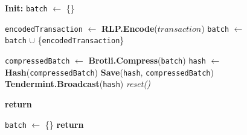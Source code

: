 \begin{figure}[t!]
  \begin{adjustbox}{minipage=[t]{\columnwidth}}
    \begin{algorithm}[H]
      \renewcommand{\thealgorithm}{Hash Collector}         
      \caption{}%
      \label{alg:collector-hash}%
      \small
      \begin{algorithmic}[1]
            \State \textbf{Init:} \texttt{batch} $\leftarrow$ \{\}
      
            \label{alg3:add_tx}
            		\State \texttt{encodedTransaction} $\leftarrow$ \textbf{RLP.Encode}($transaction$)
				\State \texttt{batch} $\leftarrow$ \texttt{batch} $\cup$ \{\texttt{encodedTransaction}\}
            
             		\State \texttt{compressedBatch} $\leftarrow$  \textbf{Brotli.Compress}(\texttt{batch})
             		\State \texttt{hash} $\leftarrow$ \textbf{Hash}(\texttt{compressedBatch})
             		\State \textbf{Save}(\texttt{hash}, \texttt{compressedBatch})
                		\State \textbf{Tendermint.Broadcast}(\texttt{hash})
                		\State \textit{reset()}
                \EndIf
                	
                \State \textbf{return}
            \EndFunction
            
            \label{alg3:reset}
            		\State \texttt{batch} $\leftarrow$ \{\}
                \State \textbf{return}
            \EndFunction
        \end{algorithmic}
      \end{algorithm}
	\end{adjustbox}
  \end{figure}

